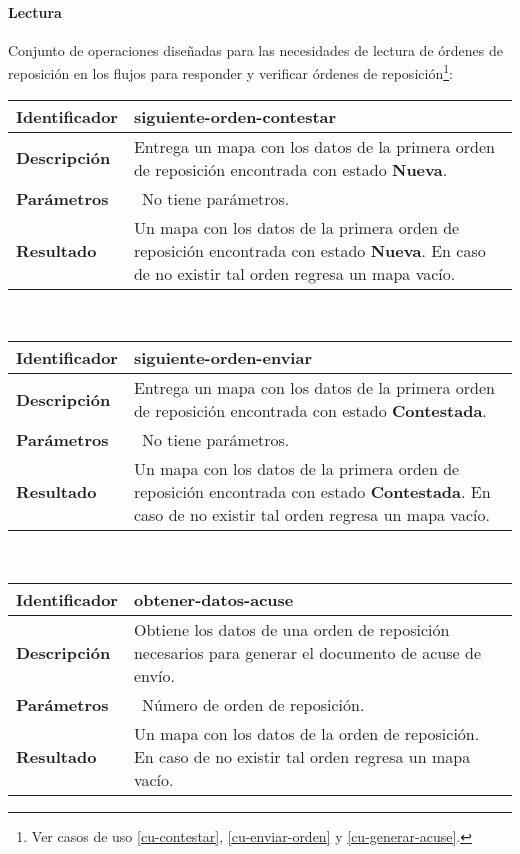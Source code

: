 \paragraph{Lectura\\}
Conjunto de operaciones diseñadas para las necesidades de lectura de órdenes de reposición en los flujos para responder y verificar órdenes de reposición\footnote{Ver casos de uso \ref{cu-contestar}, \ref{cu-enviar-orden} y \ref{cu-generar-acuse}.}:
	\vspace{5mm}\\
	\begin{tabular}{|p{}|p{}|}
		\hline
		\textbf{Identificador}	& \textbf{siguiente-orden-contestar}\\
		\hline
		\hline
		\textbf{Descripción}	& Entrega un mapa con los datos de la primera orden de reposición encontrada con estado \textbf{Nueva}.\\
		\hline
		\textbf{Parámetros} 	& \textbullet\, No tiene parámetros.\\
		\hline
		\textbf{Resultado}		& Un mapa con los datos de la primera orden de reposición encontrada con estado \textbf{Nueva}. En caso de no existir tal orden regresa un mapa vacío.\\
		\hline
	\end{tabular}
	\vspace{5mm}\\
	\begin{tabular}{|p{}|p{}|}
		\hline
		\textbf{Identificador}	& \textbf{siguiente-orden-enviar}\\
		\hline
		\hline
		\textbf{Descripción}	& Entrega un mapa con los datos de la primera orden de reposición encontrada con estado \textbf{Contestada}.\\
		\hline
		\textbf{Parámetros} 	& \textbullet\, No tiene parámetros.\\
		\hline
		\textbf{Resultado}		& Un mapa con los datos de la primera orden de reposición encontrada con estado \textbf{Contestada}. En caso de no existir tal orden regresa un mapa vacío.\\
		\hline
	\end{tabular}
	\vspace{5mm}\\
	\begin{tabular}{|p{}|p{}|}
		\hline
		\textbf{Identificador}	& \textbf{obtener-datos-acuse}\\
		\hline
		\hline
		\textbf{Descripción}	& Obtiene los datos de una orden de reposición necesarios para generar el documento de acuse de envío.\\
		\hline
		\textbf{Parámetros}		& \textbullet\, Número de orden de reposición.\\
		\hline
		\textbf{Resultado}		& Un mapa con los datos de la orden de reposición. En caso de no existir tal orden regresa un mapa vacío.\\
		\hline
	\end{tabular}
	\vspace{5mm}

